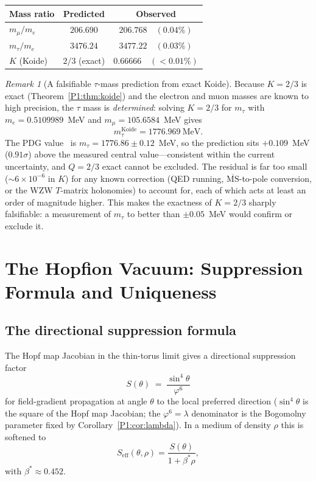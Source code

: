 \documentclass[11pt,a4paper]{article}
\theoremstyle{definition}
\theoremstyle{remark}
\newtheorem{remark}[theorem]{Remark}
\newcommand{\vp}{\varphi}
\newcommand{\lam}{\lambda}
\newcommand{\bst}{\beta^{*}}
\begin{document}
\begin{center}
\begin{tabular}{lcc}
\toprule
Mass ratio & Predicted & Observed \\
\midrule
$m_\mu/m_e$ & $206.690$ & $206.768\quad(0.04\%)$ \\
$m_\tau/m_e$ & $3476.24$ & $3477.22\quad(0.03\%)$ \\
$K$ (Koide) & $2/3$ (exact) & $0.66666\quad(<0.01\%)$ \\
\bottomrule
\end{tabular}
\end{center}

\begin{remark}[A falsifiable $\tau$-mass prediction from exact Koide]
\label{P1:rem:koide_tau}
Because $K=2/3$ is exact (Theorem~\ref{P1:thm:koide}) and the electron and
muon masses are known to high precision, the $\tau$ mass is \emph{determined}:
solving $K=2/3$ for $m_\tau$ with $m_e=0.5109989$~MeV and
$m_\mu=105.6584$~MeV gives
\begin{equation}
  m_\tau^{\mathrm{Koide}} = 1776.969~\mathrm{MeV}.
  \label{P1:eq:mtau_koide}
\end{equation}
The PDG value~\cite{PDG2024} is $m_\tau = 1776.86\pm0.12$~MeV, so the
prediction sits $+0.109$~MeV ($0.91\sigma$) above the measured central
value---consistent within the current uncertainty, and $Q=2/3$ exact
cannot be excluded.  The residual is far too small
($\sim6\times10^{-6}$ in $K$) for any known correction (QED running,
$\overline{\mathrm{MS}}$-to-pole conversion, or the WZW $T$-matrix
holonomies) to account for, each of which acts at least an order of
magnitude higher.  This makes the exactness of $K=2/3$ sharply
falsifiable: a measurement of $m_\tau$ to better than $\pm0.05$~MeV
would confirm or exclude it.
\end{remark}

\section{The Hopfion Vacuum: Suppression Formula and Uniqueness}
\label{P1:sec:vacuum_section}

\subsection{The directional suppression formula}
\label{P1:sec:alpha}
 
The Hopf map Jacobian in the thin-torus limit gives a
directional suppression factor
\begin{equation}
  S(\theta) \;=\; \frac{\sin^4\!\theta}{\vp^6}
  \label{P1:eq:suppression}
\end{equation}
for field-gradient propagation at angle $\theta$ to the local preferred
direction ($\sin^4\theta$ is the square of the Hopf map Jacobian; the
$\vp^6=\lam$ denominator is the Bogomolny parameter fixed by
Corollary~\ref{P1:cor:lambda}).  In a medium of density $\rho$ this is
softened to
\begin{equation}
  S_{\mathrm{eff}}(\theta,\rho) = \frac{S(\theta)}{1+\bst\rho},
  \label{P1:eq:Seff}
\end{equation}
with $\bst\approx0.452$.
\end{document}
